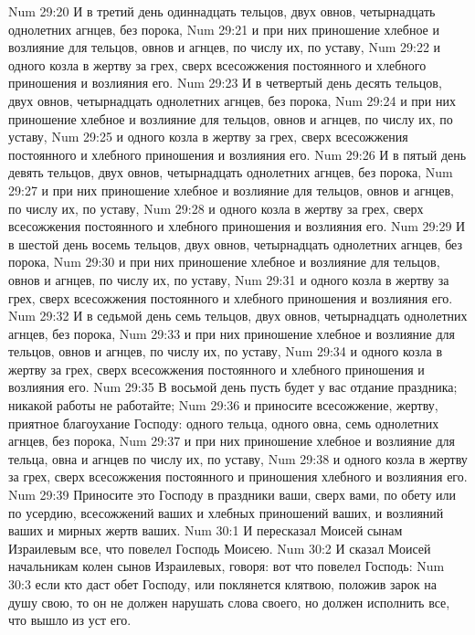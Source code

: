 \vs Num 29:20 И в третий день одиннадцать тельцов, двух овнов, четырнадцать однолетних агнцев, без порока,
\vs Num 29:21 и при них приношение хлебное и возлияние для тельцов, овнов и агнцев, по числу их, по уставу,
\vs Num 29:22 и одного козла в жертву за грех, сверх всесожжения постоянного и хлебного приношения и возлияния его.
\vs Num 29:23 И в четвертый день десять тельцов, двух овнов, четырнадцать однолетних агнцев, без порока,
\vs Num 29:24 и при них приношение хлебное и возлияние для тельцов, овнов и агнцев, по числу их, по уставу,
\vs Num 29:25 и одного козла в жертву за грех, сверх всесожжения постоянного и хлебного приношения и возлияния его.
\vs Num 29:26 И в пятый день девять тельцов, двух овнов, четырнадцать однолетних агнцев, без порока,
\vs Num 29:27 и при них приношение хлебное и возлияние для тельцов, овнов и агнцев, по числу их, по уставу,
\vs Num 29:28 и одного козла в жертву за грех, сверх всесожжения постоянного и хлебного приношения и возлияния его.
\vs Num 29:29 И в шестой день восемь тельцов, двух овнов, четырнадцать однолетних агнцев, без порока,
\vs Num 29:30 и при них приношение хлебное и возлияние для тельцов, овнов и агнцев, по числу их, по уставу,
\vs Num 29:31 и одного козла в жертву за грех, сверх всесожжения постоянного и хлебного приношения и возлияния его.
\vs Num 29:32 И в седьмой день семь тельцов, двух овнов, четырнадцать однолетних агнцев, без порока,
\vs Num 29:33 и при них приношение хлебное и возлияние для тельцов, овнов и агнцев, по числу их, по уставу,
\vs Num 29:34 и одного козла в жертву за грех, сверх всесожжения постоянного и хлебного приношения и возлияния его.
\vs Num 29:35 В восьмой день пусть будет у вас отдание праздника; никакой работы не работайте;
\vs Num 29:36 и приносите всесожжение, жертву, приятное благоухание Господу: одного тельца, одного овна, семь однолетних агнцев, без порока,
\vs Num 29:37 и при них приношение хлебное и возлияние для тельца, овна и агнцев по числу их, по уставу,
\vs Num 29:38 и одного козла в жертву за грех, сверх всесожжения постоянного и приношения хлебного и возлияния его.
\vs Num 29:39 Приносите это Господу в праздники ваши, сверх  вами, по обету или по усердию, всесожжений ваших и хлебных приношений ваших, и возлияний ваших и мирных жертв ваших.
\vs Num 30:1 И пересказал Моисей сынам Израилевым все, что повелел Господь Моисею.
\vs Num 30:2 И сказал Моисей начальникам колен сынов Израилевых, говоря: вот что повелел Господь:
\vs Num 30:3 если кто даст обет Господу, или поклянется клятвою, положив зарок на душу свою, то он не должен нарушать слова своего, но должен исполнить все, что вышло из уст его.
